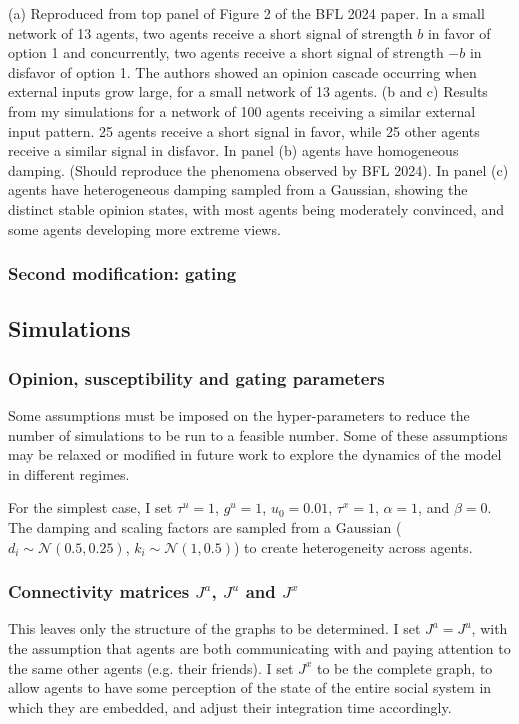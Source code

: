 \documentclass[]{article}
\begin{document}
(a) Reproduced from top panel of Figure 2 of the BFL 2024 paper. In a small network of 13 agents, two agents receive a short signal of strength $b$ in favor of option 1 and concurrently, two agents receive a short signal of strength $-b$ in disfavor of option 1. The authors showed an opinion cascade occurring when external inputs grow large, for a small network of 13 agents.
(b and c) Results from my simulations for a network of 100 agents receiving a similar external input pattern. 25 agents receive a short signal in favor, while 25 other agents receive a similar signal in disfavor. In panel (b) agents have homogeneous damping. (Should reproduce the phenomena observed by BFL 2024).
In panel (c) agents have heterogeneous damping sampled from a Gaussian, showing the distinct stable opinion states, with most agents being moderately convinced, and some agents developing more extreme views. 

\subsubsection{Second modification: gating}


\subsection{Simulations}

\subsubsection{Opinion, susceptibility and gating parameters}

Some assumptions must be imposed on the hyper-parameters to reduce the number of simulations to be run to a feasible number. Some of these assumptions may be relaxed or modified in future work to explore the dynamics of the model in different regimes.

For the simplest case, I set $\tau^u = 1$, $g^u = 1$, $u_0=0.01$, $\tau^x = 1$, $\alpha = 1$, and $\beta = 0$. The damping and scaling factors are sampled from a Gaussian ($d_i \sim \mathcal{N}(0.5,0.25)$, $k_i \sim \mathcal{N}(1,0.5)$) to create heterogeneity across agents.

\subsubsection{Connectivity matrices $J^a$, $J^u$ and $J^x$}

This leaves only the structure of the graphs to be determined. I set $J^a = J^u$, with the assumption that agents are both communicating with and paying attention to the same other agents (e.g. their friends). I set $J^x$ to be the complete graph, to allow agents to have some perception of the state of the entire social system in which they are embedded, and adjust their integration time accordingly.
\end{document}
